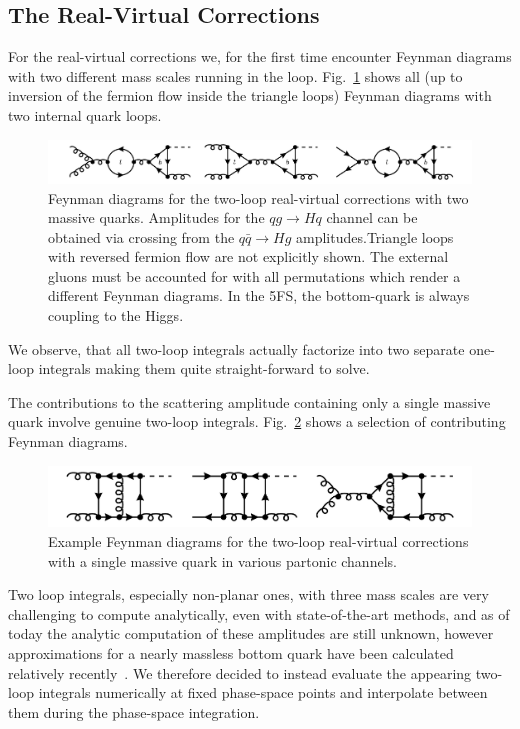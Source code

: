 \subsection{The Real-Virtual Corrections}
For the real-virtual corrections we, for the first time encounter Feynman diagrams with two different mass scales running in the loop. Fig.~\ref{fig:5:real_virtual2} shows all (up to inversion of the fermion flow inside the triangle loops) Feynman diagrams with two internal quark loops.
\begin{figure}[h]
  \centering
  \includegraphics[scale=0.5]{Images/NNLO_Feynman_diagrams/RealVirtual2.pdf}
  \caption{Feynman diagrams for the two-loop real-virtual corrections with two massive quarks. Amplitudes for the $qg \rightarrow Hq$ channel can be obtained via crossing from the $q \bar{q} \rightarrow H g$ amplitudes.Triangle loops with reversed fermion flow are not explicitly shown. The external gluons must be accounted for with all permutations which render a different Feynman diagrams. In the 5\acs{FS}, the bottom-quark is always coupling to the Higgs.}
  \label{fig:5:real_virtual2}
\end{figure}
We observe, that all two-loop integrals actually factorize into two separate one-loop integrals making them quite straight-forward to solve.

The contributions to the scattering amplitude containing only a single massive quark involve genuine two-loop integrals. Fig.~\ref{fig:5:real_virtual1} shows a selection of contributing Feynman diagrams.
\begin{figure}[h]
  \centering
  \includegraphics[width=\figurewidth]{Images/NNLO_Feynman_diagrams/RealVirtual1.pdf}
  \caption{Example Feynman diagrams for the two-loop real-virtual corrections with a single massive quark in various partonic channels.}
  \label{fig:5:real_virtual1}
\end{figure}
Two loop integrals, especially non-planar ones, with three mass scales are very challenging to compute analytically, even with state-of-the-art methods, and as of today the analytic computation of these amplitudes are still unknown, however approximations for a nearly massless bottom quark have been calculated relatively recently~\cite{Melnikov:2016qoc, Melnikov:2017pgf}. We therefore decided to instead evaluate the appearing two-loop integrals numerically at fixed phase-space points and interpolate between them during the phase-space integration.


